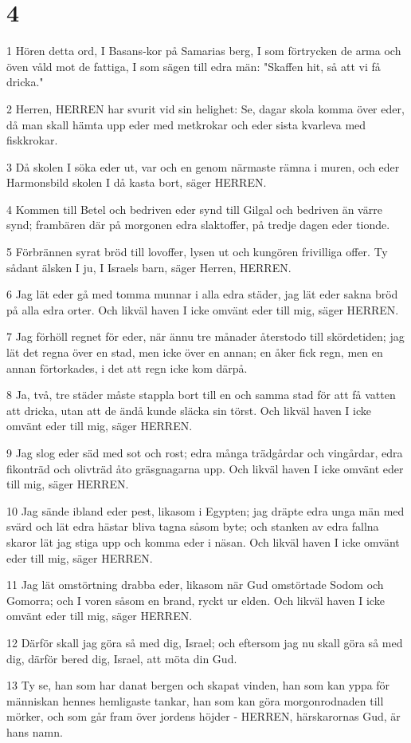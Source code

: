 \chapter{4}

\par 1 Hören detta ord, I Basans-kor på Samarias berg, I som förtrycken de arma och öven våld mot de fattiga, I som sägen till edra män: "Skaffen hit, så att vi få dricka."
\par 2 Herren, HERREN har svurit vid sin helighet: Se, dagar skola komma över eder, då man skall hämta upp eder med metkrokar och eder sista kvarleva med fiskkrokar.
\par 3 Då skolen I söka eder ut, var och en genom närmaste rämna i muren, och eder Harmonsbild skolen I då kasta bort, säger HERREN.
\par 4 Kommen till Betel och bedriven eder synd till Gilgal och bedriven än värre synd; frambären där på morgonen edra slaktoffer, på tredje dagen eder tionde.
\par 5 Förbrännen syrat bröd till lovoffer, lysen ut och kungören frivilliga offer. Ty sådant älsken I ju, I Israels barn, säger Herren, HERREN.
\par 6 Jag lät eder gå med tomma munnar i alla edra städer, jag lät eder sakna bröd på alla edra orter. Och likväl haven I icke omvänt eder till mig, säger HERREN.
\par 7 Jag förhöll regnet för eder, när ännu tre månader återstodo till skördetiden; jag lät det regna över en stad, men icke över en annan; en åker fick regn, men en annan förtorkades, i det att regn icke kom därpå.
\par 8 Ja, två, tre städer måste stappla bort till en och samma stad för att få vatten att dricka, utan att de ändå kunde släcka sin törst. Och likväl haven I icke omvänt eder till mig, säger HERREN.
\par 9 Jag slog eder säd med sot och rost; edra många trädgårdar och vingårdar, edra fikonträd och olivträd åto gräsgnagarna upp. Och likväl haven I icke omvänt eder till mig, säger HERREN.
\par 10 Jag sände ibland eder pest, likasom i Egypten; jag dräpte edra unga män med svärd och lät edra hästar bliva tagna såsom byte; och stanken av edra fallna skaror lät jag stiga upp och komma eder i näsan. Och likväl haven I icke omvänt eder till mig, säger HERREN.
\par 11 Jag lät omstörtning drabba eder, likasom när Gud omstörtade Sodom och Gomorra; och I voren såsom en brand, ryckt ur elden. Och likväl haven I icke omvänt eder till mig, säger HERREN.
\par 12 Därför skall jag göra så med dig, Israel; och eftersom jag nu skall göra så med dig, därför bered dig, Israel, att möta din Gud.
\par 13 Ty se, han som har danat bergen och skapat vinden, han som kan yppa för människan hennes hemligaste tankar, han som kan göra morgonrodnaden till mörker, och som går fram över jordens höjder - HERREN, härskarornas Gud, är hans namn.

